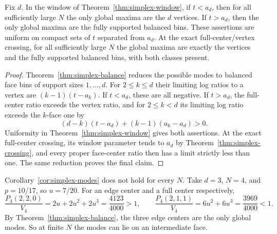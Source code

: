 \begin{corollary}\label{cor:simplex-modes}
Fix $d$. In the window of Theorem~\ref{thm:simplex-window}, if $t<a_d$,
then for all sufficiently large $N$ the only global maxima are the $d$
vertices. If $t>a_d$, then the only global maxima are the fully supported
balanced bins. These assertions are uniform on compact sets of $t$
separated from $a_d$. At the exact full-center/vertex crossing, for all
sufficiently large $N$ the global maxima are exactly the vertices and the
fully supported balanced bins, with both classes present.
\end{corollary}

\begin{proof}
Theorem~\ref{thm:simplex-balance} reduces the possible modes to balanced
face bins of support sizes $1,\ldots,d$. For $2\le k\le d$ their limiting log ratios to a
vertex are $(k-1)(t-a_k)$. If $t<a_d$, these are all negative. If $t>a_d$,
the full-center ratio exceeds the vertex ratio, and for $2\le k<d$ its limiting log ratio exceeds the $k$-face
one by
\[
(d-k)(t-a_d)+(k-1)(a_k-a_d)>0.
\]
Uniformity in Theorem~\ref{thm:simplex-window} gives both assertions.
At the exact full-center crossing, its window parameter tends to $a_d$
by Theorem~\ref{thm:simplex-crossing}, and every proper face-center ratio then
has a limit strictly less than one. The same reduction proves the final
claim.
\end{proof}

\begin{example}\label{ex:simplex-edge-mode}
Corollary~\ref{cor:simplex-modes} does not hold for every $N$.
Take $d=3$, $N=4$, and $p=10/17$, so $u=7/20$.
For an edge center and a full center respectively,
\[
\frac{P_4(2,2,0)}{V_4}=2u+2u^2+2u^3=\frac{4123}{4000}>1,
\qquad
\frac{P_4(2,1,1)}{V_4}=6u^2+6u^3=\frac{3969}{4000}<1.
\]
By Theorem~\ref{thm:simplex-balance}, the three edge centers are the
only global modes. So at finite $N$ the modes can lie on an intermediate
face.
\end{example}
